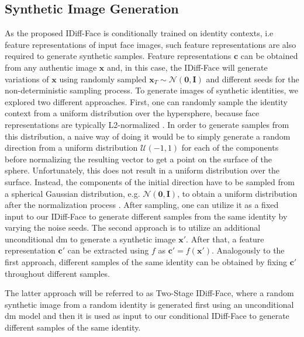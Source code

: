 \documentclass[10pt,twocolumn,letterpaper]{article}
\newcommand{\approachname}{IDiff-Face }
\newcommand{\approachnamewithoutspace}{IDiff-Face}
\begin{document}
\subsection{Synthetic Image Generation}
\vspace{-1mm}
As the proposed \approachname is conditionally trained on identity contexts, i.e feature representations of input face images, such feature representations are also required to generate synthetic samples. Feature representations $\mathbf{c}$ can be obtained from any authentic image $\mathbf{x}$ and, in this case, the \approachname will generate variations of $\mathbf{x}$ using randomly sampled $\mathbf{x}_T \sim \mathcal{N}(\mathbf{0,I})$ and different seeds for the non-deterministic sampling process. To generate images of synthetic identities, we explored two different approaches. First, one can randomly sample the identity context from a uniform distribution over the hypersphere, because face representations are typically L2-normalized \cite{ElasticFace,CosFace}. In order to generate samples from this distribution, a naive way of doing it would be to simply generate a random direction from a uniform distribution $\mathcal{U}(-1,1)$ for each of the components before normalizing the resulting vector to get a point on the surface of the sphere. Unfortunately, this does not result in a uniform distribution over the surface. Instead, the components of the initial direction have to be sampled from a spherical Gaussian distribution, e.g. $\mathcal{N}(\mathbf{0},\mathbf{I})$, to obtain a uniform distribution after the normalization process \cite{Marsaglia1972}. After sampling, one can utilize it as a fixed input to our \approachname to generate different samples from the same identity by varying the noise seeds. 
The second approach is to utilize an additional unconditional \acrshort{dm} to generate a synthetic image $\mathbf{x}'$. After that, a feature representation $\mathbf{c}'$ can be extracted using $f$ as $\mathbf{c}'=f(\mathbf{x}')$. Analogously to the first approach, different samples of the same identity can be obtained by fixing $\mathbf{c}'$ throughout different samples.

The latter approach will be referred to as Two-Stage \approachnamewithoutspace, where a random synthetic image from a random identity is generated first using an unconditional \acrshort{dm} model and then it is used as input to our conditional \approachname to generate different samples of the same identity.
\end{document}
